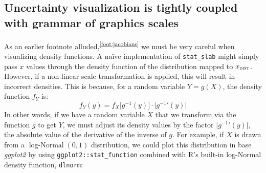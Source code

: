 \documentclass[journal]{vgtc}                     %
\begin{document}



\subsection{Uncertainty visualization is tightly coupled\\with grammar of graphics scales}
\label{sec:jacobians}

As an earlier footnote alluded,\textsuperscript{\ref{foot:jacobians}}   we must be very careful when visualizing density functions. A na\"{i}ve implementation of \texttt{stat\_slab} might simply pass $x$ values through the density function of the distribution mapped to $x_\textsc{dist}$. However, if a non-linear scale transformation is applied, this will result in incorrect densities. This is because, for a random variable $Y = g(X)$, the density function $f_Y$ is:
\[
f_Y(y) = f_X\big[g^{-1}(y)\big] \cdot \big| {g^{-1}}'(y) \big|
\]
In other words, if we have a random variable $X$ that we transform via the function $g$ to get $Y$, we must adjust its density values by the factor $\lvert {g^{-1}}'(y) \rvert$, the absolute value of the derivative of the inverse of $g$. For example, if $X$ is drawn from a $\operatorname{log-Normal}(0, 1)$ distribution, we could plot this distribution in base \textit{ggplot2} by using \texttt{ggplot2::stat\_function} combined with R's built-in log-Normal density function, \texttt{dlnorm}:
\end{document}
